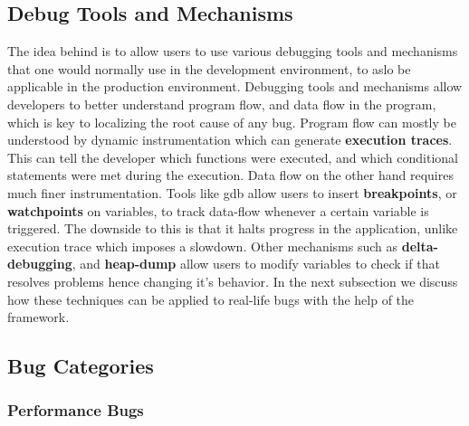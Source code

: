 \subsection{Debug Tools and Mechanisms}
\label{sec:debugMechanisms}

The idea behind \parikshan is to allow users to use various debugging tools and mechanisms that one would normally use in the development environment, to aslo be applicable in the production environment.
Debugging tools and mechanisms allow developers to better understand program flow, and data flow in the program, which is key to localizing the root cause of any bug.
Program flow can mostly be understood by dynamic instrumentation which can generate \textbf{execution traces}. 
This can tell the developer which functions were executed, and which conditional statements were met during the execution.
Data flow on the other hand requires much finer instrumentation. 
Tools like gdb allow users to insert \textbf{breakpoints}, or \textbf{watchpoints} on variables, to track data-flow whenever a certain variable is triggered.
The downside to this is that it halts progress in the application, unlike execution trace which imposes a slowdown. 
Other mechanisms such as \textbf{delta-debugging}, and \textbf{heap-dump} allow users to modify variables to check if that resolves problems hence changing it's behavior.
In the next subsection we discuss how these techniques can be applied to real-life bugs with the help of the \parikshan framework.

\subsection{Bug Categories}
\label{sec:bugCategories}

\subsubsection{Performance Bugs}
\label{sec:performanceBugs}

